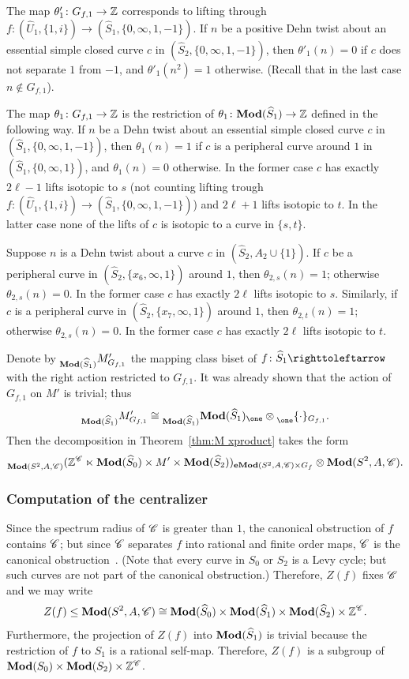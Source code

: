\documentclass{amsart}
\begin{document}
The map $\theta'_1\colon G_{f,1}\to {\mathbb Z}$ corresponds to lifting through
$f\colon (\widehat U_1,\{1,i\})\to (\widehat S_1,\{0,\infty,
1,-1\})$. If $n$ be a positive Dehn twist about an essential simple
closed curve $c$ in $(\widehat S_2,\{0,\infty, 1,-1\})$, then
$\theta'_1(n)=0$ if $c$ does not separate $1$ from $-1$, and
$\theta'_1(n^2)=1$ otherwise. (Recall that in the last case
$n\notin G_{f,1}$).

The map $\theta_{1}\colon G_{f,1}\to {\mathbb Z}$ is the restriction of
$\theta_{1}\colon \mathbf{\relax Mod}(\widehat S_1)\to {\mathbb Z}$ defined in the following
way.  If $n$ be a Dehn twist about an essential simple closed curve
$c$ in $(\widehat S_1,\{0,\infty, 1,-1\})$, then $\theta_{1}(n)=1$ if
$c$ is a peripheral curve around $1$ in
$(\widehat S_1,\{0,\infty, 1\})$, and $\theta_{1}(n)=0$ otherwise. In
the former case $c$ has exactly $2\ell-1$ lifts isotopic to $s$ (not
counting lifting trough
$f\colon (\widehat U_1,\{1,i\})\to (\widehat S_1,\{0,\infty, 1,-1\})$)
and $2\ell+1$ lifts isotopic to $t$. In the latter case none of the
lifts of $c$ is isotopic to a curve in $\{s,t\}$.

Suppose $n$ is a Dehn twist about a curve $c$ in
$(\widehat S_2, A_2\cup\{1\})$. If $c$ be a peripheral curve in
$(\widehat S_2,\{x_6,\infty, 1\})$ around $1$, then
$\theta_{2,s}(n)=1$; otherwise $\theta_{2,s}(n)=0$. In the former case
$c$ has exactly $2\ell$ lifts isotopic to $s$. Similarly, if $c$ is a
peripheral curve in $(\widehat S_2,\{x_7,\infty, 1\})$ around $1$,
then $\theta_{2,t}(n)=1$; otherwise $\theta_{2,s}(n)=0$. In the former
case $c$ has exactly $2\ell$ lifts isotopic to $t$.

Denote by $\subscript{\Mod(\widehat S_1)}M'_{G_{f,1}}$ the mapping
class biset of $f\colon \widehat S_1\selfmap$ with the right action
restricted to $G_{f,1}$. It was already shown that the action of
$G_{f,1}$ on $M'$ is trivial; thus
\[\subscript{\Mod(\widehat S_1)}M'_{G_{f,1}}\cong \subscript{\Mod(\widehat S_1)}\Mod(\widehat S_1)_\one \otimes \subscript{\one}\{\cdot\}_{G_{f,1}}.  \]
Then the decomposition in Theorem~\ref{thm:M
  xproduct} takes the form
\[\subscript{\Mod(S^2,A,\CC)}(\Z^{\CC}\ltimes \Mod(\widehat S_0) \times M'\times \Mod(\widehat S_2))_{\Mod[e](S^2,A,\CC)\times G_f}\otimes \Mod(S^2,A,\CC).\] 

\subsubsection{Computation of the centralizer}
Since the spectrum radius of ${\mathscr C}$ is greater than $1$, the canonical
obstruction of $f$ contains ${\mathscr C}$; but since ${\mathscr C}$ separates $f$ into
rational and finite order maps, ${\mathscr C}$ is the canonical
obstruction~\cite{pilgrim:combinations}. (Note that every curve in
$S_0$ or $S_2$ is a Levy cycle; but such curves are not part of the
canonical obstruction.) Therefore, $Z(f)$ fixes ${\mathscr C}$ and we may write
\[Z(f)\le \mathbf{\relax Mod}(S^2,A,{\mathscr C})\cong \mathbf{\relax Mod}(\widehat S_0)\times \mathbf{\relax Mod}(\widehat S_1)\times
  \mathbf{\relax Mod}(\widehat S_2)\times {\mathbb Z}^{{\mathscr C}}.
\] 
Furthermore, the projection of $Z(f)$ into $\mathbf{\relax Mod}(\widehat S_1)$ is trivial
because the restriction of $f$ to $S_1$ is a rational
self-map. Therefore, $Z(f)$ is a subgroup of $\mathbf{\relax Mod}(S_0)\times \mathbf{\relax Mod}(S_2)\times{\mathbb Z}^{\mathscr C}$. 
\end{document}
